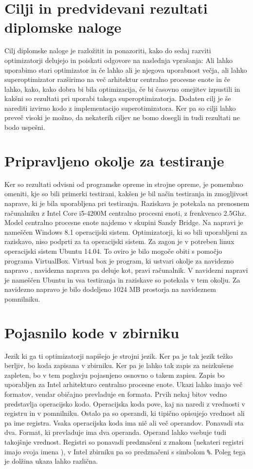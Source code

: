 \documentclass[a4paper, 12pt]{book}
\begin{document}
\section{Cilji in predvidevani rezultati diplomske naloge}
Cilj diplomske naloge je razložitit in ponazoriti, kako do sedaj razviti optimizatorji delujejo in poiskati odgovore na naslednja vprašanja: Ali lahko uporabimo stari optimizator in če lahko ali je njegova uporabnost večja, ali lahko superoptimizator razširimo na več arhitektur centralno procesne enote in če lahko, kako, kako dobra bi bila optimizacija, če bi časovno omejitev izpustili in kakšni so rezultati pri uporabi takega superoptimizatorja. Dodaten cilj je še narediti izvirno kodo z implementacijo superotimizatora. Ker pa so cilji lahko preveč visoki je možno, da nekaterih ciljev ne bomo dosegli in tudi rezultati ne bodo uspešni.
\section{Pripravljeno okolje za testiranje}
Ker so rezultati odvisni od programske opreme in strojne opreme, je pomembno omeniti, kje so bili primerki testirani, kakšen je bil način testiranja in zmogljivost naprave, ki je bila uporabljena pri testiranju. Raziskava je potekala na prenosnem računalniku z Intel Core i5-4200M centralno procesni enoti, z frenkvenco 2.5Ghz. Model centralno procesne enote najdemo v skupini Sandy Bridge. Na napravi je nameščen Windows 8.1 operacijski sistem. Optimizatorji, ki so bili uporabljeni za raziskavo, niso podprti za ta operacijski sistem. Za zagon je v potreben linux operacijski sistem Ubuntu 14.04. To oviro je bilo mogoče obiti s pomočjo programa VirtualBox. Virtual box je program, ki ustvari okolje za navidezno napravo \cite{box}, navidezna naprava pa deluje kot, pravi računalnik. V navidezni napravi je nameščen Ubuntu in vsa testiranja in raziskave so potekala v tem okolju. Za navidezno napravo je bilo dodeljeno 1024 MB prostorja na navideznem pomnilniku. 
\section{Pojasnilo kode v zbirniku}
Jezik ki ga ti optimizatorji napišejo je strojni jezik. Ker pa je tak jezik težko berljiv, bo koda zapisana v zbirniku. Ker pa je lahko tak zapis za neizkušene zapleten, bo v tem poglavju pojasnjeno osnovno o takem zapisu. Zapis bo uporabljen za Intel arhitekturo centralno procesne enote. Ukazi lahko imajo več formatov, vendar običajno prevladuje en formata. Prvih nekaj bitov vedno predstavlja operacijsko kodo. Operacijska koda pove, kaj na naredi z vrednosti v registru in v pomnilniku. Ostalo pa so operandi, ki tipično opisujejo vrednost ali pa ime registra. Vsaka operacijska koda ima nič ali več operandov. Ponavadi sta dva. Format, ki prevladuje ima dva operanda. Operand lahko vsebuje tudi takojšnje vrednost. Registri so ponavadi predznačeni z znakom \r (nekateri registri imajo svoja imena \cite{asem}), v Intel zbirniku pa so predznačeni s simbolom \texttt{\%}. Poleg tega je dolžina ukaza lahko različna.
\end{document}
